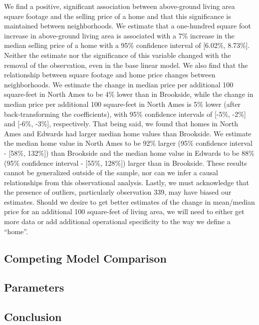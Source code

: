 \documentclass[american,]{article}
\begin{document}
We find a positive, significant association between above-ground living
area square footage and the selling price of a home and that this
significance is maintained between neighborhoods. We estimate that a
one-hundred square foot increase in above-ground living area is
associated with a 7\% increase in the median selling price of a home
with a 95\% confidence interval of {[}6.02\%, 8.73\%{]}. Neither the
estimate nor the significance of this variable changed with the removal
of the observation, even in the base linear model. We also find that the
relationship between square footage and home price changes between
neighborhoods. We estimate the change in median price per additional 100
square-feet in North Ames to be 4\% lower than in Brookside, while the
change in median price per additional 100 square-feet in North Ames is
5\% lower (after back-transforming the coefficients), with 95\%
confidence intervals of {[}-5\%, -2\%{]} and {[}-6\%, -3\%{]},
respectively. That being said, we found that homes in North Ames and
Edwards had larger median home values than Brookside. We estimate the
median home value in North Ames to be 92\% larger (95\% confidence
interval - {[}58\%, 132\%{]}) than Brookside and the median home value
in Edwards to be 88\% (95\% confidence interval - {[}55\%, 128\%{]})
larger than in Brookside. These results cannot be generalized outside of
the sample, nor can we infer a causal relationships from this
observational analysis. Lastly, we must acknowledge that the presence of
outliers, particularly observation 339, may have biased our estimates.
Should we desire to get better estimates of the change in mean/median
price for an additional 100 square-feet of living area, we will need to
either get more data or add additional operational specificity to the
way we define a ``home''.

\subsection{Competing Model
Comparison}\label{competing-model-comparison}

\subsection{Parameters}\label{parameters}

\subsection{Conclusion}\label{conclusion}
\end{document}
